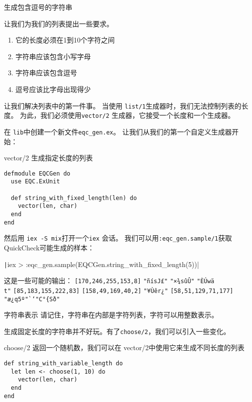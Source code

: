 \begin{example}{生成包含逗号的字符串}

让我们为我们的列表提出一些要求。

\begin{enumerate}
	\item 它的长度必须在1到10个字符之间
  \item 字符串应该包含小写字母
  \item 字符串应该包含逗号
  \item 逗号应该比字母出现得少
\end{enumerate}

让我们解决列表中的第一件事。
当使用 \texttt{list/1}生成器时，我们无法控制列表的长度。
为此，我们必须使用\texttt{vector/2} 生成器，它接受一个长度和一个生成器。

在 \texttt{lib}中创建一个新文件\texttt{eqc\_gen.ex}。
让我们从我们的第一个自定义生成器开始：

\begin{code}{vector/2 生成指定长度的列表}
\begin{verbatim}
defmodule EQCGen do
  use EQC.ExUnit

  def string_with_fixed_length(len) do
    vector(len, char)
  end
end
\end{verbatim}
\end{code}

然后用 \texttt{iex -S mix}打开一个\texttt{iex} 会话。
我们可以用\texttt{:eqc\_gen.sample/1}获取QuickCheck可能生成的样本：

\texttt|iex > :eqc_gen.sample(EQCGen.string\_with\_fixed\_length(5))|

这是一些可能的输出：
\texttt{[170,246,255,153,8]}
\texttt{"ñísJ£"} \texttt{"×¾sûÛ"}
\texttt{"ÈÚwä\\t"}
\texttt{[85,183,155,222,83]}
\texttt{[158,49,169,40,2]}
\texttt{"¥Ùêr¿"}
\texttt{[58,51,129,71,177]}
\texttt{"æ¿q5º"``"C°\{Sð"}

\begin{note}{字符串表示}
请记住，字符串在内部是字符列表，字符可以用整数表示。
\end{note}

生成固定长度的字符串并不好玩。有了\texttt{choose/2}，我们可以引入一些变化。


\begin{code}{choose/2 返回一个随机数，我们可以在 vector/2中使用它来生成不同长度的列表}
\begin{verbatim}
def string_with_variable_length do
  let len <- choose(1, 10) do
    vector(len, char)
  end
end
\end{verbatim}
\label{lst:using_choose_2_to_return_a_random_number_we_can_use_in_vector_2_to_generate_lists_of_different_lengths}
\end{code}


\end{example}
